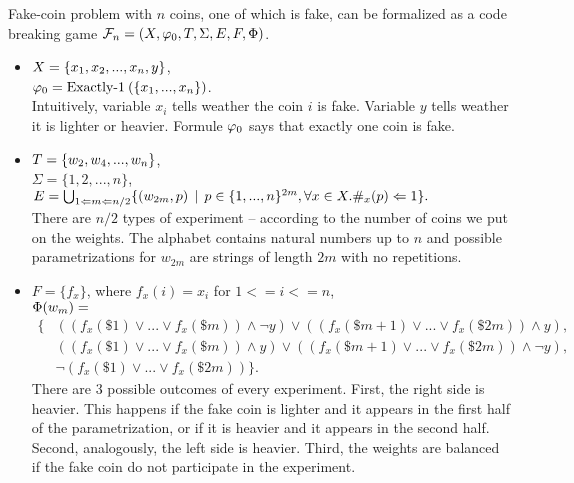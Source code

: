 \begin{example} \label{form-fake-coin1}
Fake-coin problem with $n$ coins, one of which is fake, can be formalized as
a code breaking game
$\mathcal{F}_n = (X, \varphi_0, T, \Sigma, E, F, \Phi)$.

\begin{itemize}
\item
$X = \{x_1, x_2, ..., x_n, y\}$, \\
$\varphi_0 = \textrm{Exactly-1}\:(\{x_1, ..., x_n\})$. \\
Intuitively, variable $x_i$ tells weather the coin $i$ is fake.
Variable $y$ tells weather it is lighter or heavier.
Formule $\varphi_0$ says that exactly one coin is fake.

\item
$T = \{ w_2, w_4, ..., w_n \}$, \\
$\Sigma = \{1, 2,...,n\}$, \\
$E = \bigcup_{1<=m<=n/2} \{ (w_{2m}, p) \:\:|\:\:
  p \in \{1,...,n\}^{2m}, \forall x\in X. \#_x(p)<=1 \}. $\\
There are $n/2$ types of experiment -- according to the number of coins we put on the weights.
The alphabet contains natural numbers up to $n$ and
possible parametrizations for $w_{2m}$ are strings of length $2m$ with no repetitions.

\item
$F = \{ f_x \}$, where $f_x(i) = x_i$ for $1 <= i <= n$, \\
$\Phi(w_m) = $ \vspace{-4mm}
\begin{align*}
  \big\{
& ((f_x(\$1) \vee ... \vee f_x(\$m)) \wedge \neg y) \vee ((f_x(\$m+1) \vee ... \vee f_x(\$2m)) \wedge y), \\
& ((f_x(\$1) \vee ... \vee f_x(\$m)) \wedge y) \vee ((f_x(\$m+1) \vee ... \vee f_x(\$2m)) \wedge \neg y), \\
& \neg (f_x(\$1) \vee ... \vee f_x(\$2m)) \big\}.
\end{align*}
There are 3 possible outcomes of every experiment.
First, the right side is heavier. This happens if the fake coin is lighter and it appears in the first half of the parametrization, or if it is heavier and it appears in the second half. Second, analogously, the left side is heavier.
Third, the weights are balanced if the fake coin do not participate in the experiment.
\end{itemize}
\end{example}

